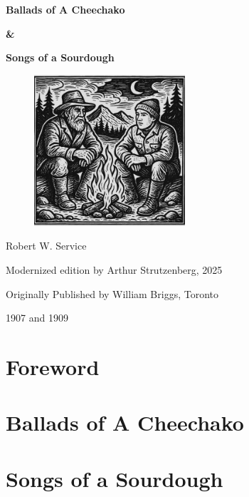 \documentclass[10pt]{book}
\begin{document}
\thispagestyle{empty}
\null
\newpage

\thispagestyle{empty}
\null
\newpage

\begin{titlepage}
\centering
{\Huge\bfseries Ballads of A Cheechako\par}
{\Huge\bfseries \&\par}
{\Huge\bfseries Songs of a Sourdough\par}
\vspace{2em}

\begin{figure}[htbp]
  \centering
  \includegraphics[width=0.5\textwidth]{images/fireside}
\end{figure}

{\Huge Robert W. Service\par}


\vspace{10em}
{\large Modernized edition by Arthur Strutzenberg, 2025\par}
{\large Originally Published by William Briggs, Toronto\par}
{\large 1907 and 1909}
\end{titlepage}

\newpage
\thispagestyle{empty}
\null
\newpage

\frontmatter
\tableofcontents
\newpage

\mainmatter
\chapter*{Foreword}
\markboth{}{}



\cleardoublepage
\chapter*{Ballads of A Cheechako}


\cleardoublepage
\chapter*{Songs of a Sourdough}

\end{document}
